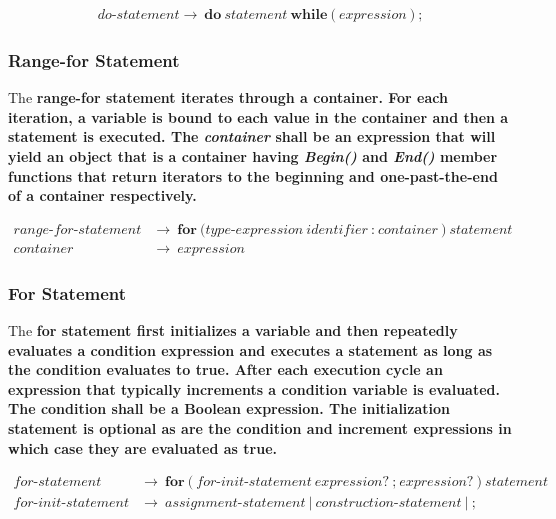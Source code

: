 \documentclass[a4paper,oneside,11pt]{article}
\begin{document}
\begin{align*}
do\textrm{-}statement \rightarrow \> \textbf{do} \> \hyperref[statement]{statement} \> \textbf{while} \> \texttt{(} \>
\hyperref[expression]{expression} \> \texttt{)} \> \texttt{;}
\end{align*}

\subsubsection{Range-for Statement}\label{rangeforstatement}
The \bf{range-for} statement iterates through a container.
For each iteration, a variable is bound to each value in the container and then a statement is executed.
The \emph{container} shall be an expression that will yield an object that is a container having \emph{Begin()} and \emph{End()} member functions
that return iterators to the beginning and one-past-the-end of a container respectively.

\begin{align*}
range\textrm{-}for\textrm{-}statement &\rightarrow \> \textbf{for} \> \texttt{(} \hyperref[typeexpr]{type\textrm{-}expression} \>
\hyperref[identifier]{identifier} \> \texttt{:} \> container \> \texttt{)} \> \hyperref[statement]{statement}\\
container &\rightarrow \> \hyperref[expression]{expression}
\end{align*}

\subsubsection{For Statement}\label{forstatement}

The \bf{for} statement first initializes a variable and then
repeatedly evaluates a condition expression and executes a statement as long as the condition evaluates to \bf{true}.
After each execution cycle an expression that typically increments a condition variable is evaluated.
The condition shall be a Boolean expression.
The initialization statement is optional as are the condition and increment expressions in which case they are evaluated as \bf{true}.

\begin{align*}
for\textrm{-}statement &\rightarrow \> \textbf{for} \> \texttt{(} \> for\textrm{-}init\textrm{-}statement \>
\hyperref[expression]{expression}? \> \texttt{;} \> \hyperref[expression]{expression}? \> \texttt{)} \> \hyperref[statement]{statement}\\
for\textrm{-}init\textrm{-}statement &\rightarrow \> \hyperref[assignmentstatement]{assignment\textrm{-}statement} \> | \>
\hyperref[constructionstatement]{construction\textrm{-}statement} \> | \> \texttt{;}
\end{align*}
\end{document}
